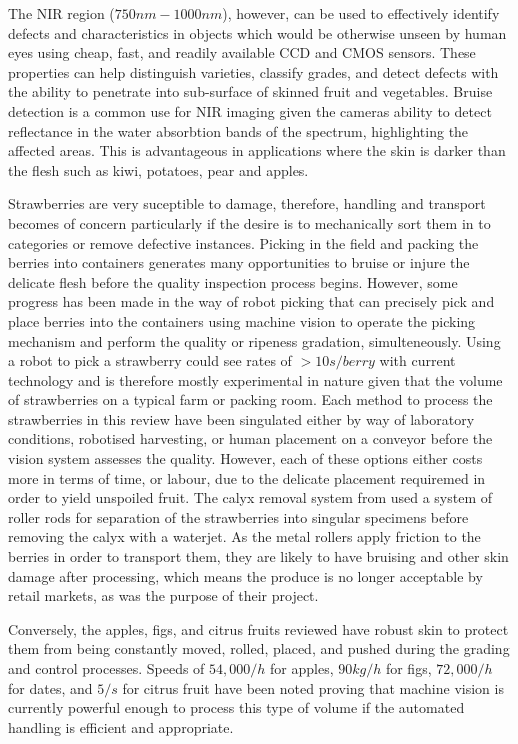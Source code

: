 \documentclass[fleqn,twoside,12pt]{report}
\begin{document}
The NIR region ($750nm-1000nm$), however, can be used to effectively identify defects and characteristics in objects which would be otherwise unseen by human eyes using cheap, fast, and readily available CCD and CMOS sensors. These properties can help distinguish varieties, classify grades, and detect defects with the ability to penetrate into sub-surface of skinned fruit and vegetables. Bruise detection is a common use for NIR imaging given the cameras ability to detect reflectance in the water absorbtion bands of the spectrum, highlighting the affected areas. This is advantageous in applications where the skin is darker than the flesh such as kiwi, potatoes, pear and apples.

Strawberries are very suceptible to damage, therefore, handling and transport becomes of concern particularly if the desire is to mechanically sort them in to categories or remove defective instances. Picking in the field and packing the berries into containers generates many opportunities to bruise or injure the delicate flesh before the quality inspection process begins. However, some progress has been made in the way of robot picking that can precisely pick and place berries into the containers using machine vision to operate the picking mechanism and perform the quality or ripeness gradation, simulteneously. Using a robot to pick a strawberry could see rates of $>10s/berry$ with current technology and is therefore mostly experimental in nature given that the volume of strawberries on a typical farm or packing room. Each method to process the strawberries in this review have been singulated either by way of laboratory conditions, robotised harvesting, or human placement on a conveyor before the vision system assesses the quality. However, each of these options either costs more in terms of time, or labour, due to the delicate placement requiremed in order to yield unspoiled fruit. The calyx removal system from \cite{lin} used a system of roller rods for separation of the strawberries into singular specimens before removing the calyx with a waterjet. As the metal rollers apply friction to the berries in order to transport them, they are likely to have bruising and other skin damage after processing, which means the produce is no longer acceptable by retail markets, as was the purpose of their project. 

Conversely, the apples, figs, and citrus fruits reviewed have robust skin to protect them from being constantly moved, rolled, placed, and pushed during the grading and control processes. Speeds of $54,000/h$ for apples, $90kg/h$ for figs, $72,000/h$ for dates, and $5/s$ for citrus fruit have been noted proving that machine vision is currently powerful enough to process this type of volume if the automated handling is efficient and appropriate.
\end{document}

